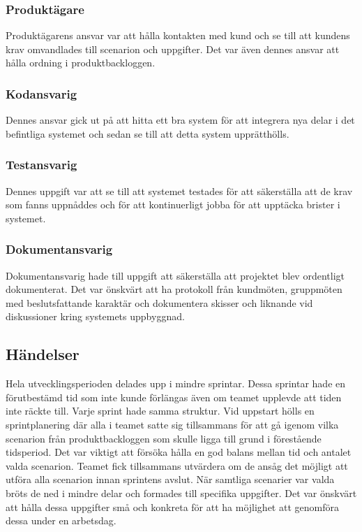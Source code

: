 \subsubsection{Produktägare}
Produktägarens ansvar var att hålla kontakten med kund och se till att kundens krav omvandlades till scenarion och uppgifter. Det var även dennes ansvar att hålla ordning i produktbackloggen.

\subsubsection{Kodansvarig}
Dennes ansvar gick ut på att hitta ett bra system för att integrera nya delar i det befintliga systemet och sedan se till att detta system upprätthölls.

\subsubsection{Testansvarig}
Dennes uppgift var att se till att systemet testades för att säkerställa att de krav som fanns uppnåddes och för att kontinuerligt jobba för att upptäcka brister i systemet.

\subsubsection{Dokumentansvarig}
Dokumentansvarig hade till uppgift att säkerställa att projektet blev ordentligt dokumenterat. Det var önskvärt att ha protokoll från kundmöten, gruppmöten med beslutsfattande karaktär och dokumentera skisser och liknande vid diskussioner kring systemets uppbyggnad.

\subsection{Händelser}
Hela utvecklingsperioden delades upp i mindre sprintar. Dessa sprintar hade en förutbestämd tid som inte kunde förlängas även om teamet upplevde att tiden inte räckte till. Varje sprint hade samma struktur. Vid uppstart hölls en sprintplanering där alla i teamet satte sig tillsammans för att gå igenom vilka scenarion från produktbackloggen som skulle ligga till grund i förestående tidsperiod. Det var viktigt att försöka hålla en god balans mellan tid och antalet valda scenarion. Teamet fick tillsammans utvärdera om de ansåg det möjligt att utföra alla scenarion innan sprintens avslut. När samtliga scenarier var valda bröts de ned i mindre delar och formades till specifika uppgifter. Det var önskvärt att hålla dessa uppgifter små och konkreta för att ha möjlighet att genomföra dessa under en arbetsdag.


